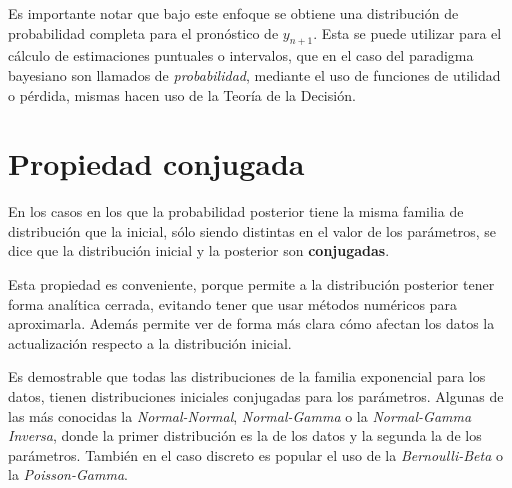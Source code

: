 Es importante notar que bajo este enfoque se obtiene una distribuci\'on de probabilidad completa para  el pron\'ostico de $y_{n+1}$. Esta se puede utilizar para el c\'alculo de estimaciones puntuales o intervalos, que en el caso del paradigma bayesiano son llamados de \textit{probabilidad}, mediante el uso de funciones de utilidad o p\'erdida, mismas hacen uso de la Teor\'ia de la Decisi\'on.

\section{Propiedad conjugada}

En los casos en los que la probabilidad posterior tiene la misma familia de distribuci\'on que la inicial, s\'olo siendo distintas en el valor de los par\'ametros, se dice que la distribuci\'on inicial y la posterior son \textbf{conjugadas}.

Esta propiedad es conveniente, porque permite a la distribuci\'on posterior tener forma anal\'itica cerrada, evitando tener que usar m\'etodos num\'ericos para aproximarla. Adem\'as permite ver de forma m\'as clara c\'omo afectan los datos la actualizaci\'on respecto a la distribuci\'on inicial.

Es demostrable que todas las distribuciones de la familia exponencial para los datos, tienen distribuciones iniciales conjugadas para los par\'ametros. Algunas de las m\'as conocidas la \textit{Normal-Normal}, \textit{Normal-Gamma} o la \textit{Normal-Gamma Inversa}, donde la primer distribuci\'on es la de los datos y la segunda la de los par\'ametros. Tambi\'en en el caso discreto es popular el uso de la \textit{Bernoulli-Beta} o la \textit{Poisson-Gamma}.

\newpage